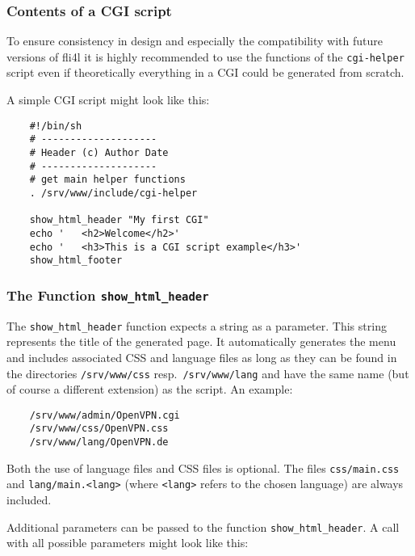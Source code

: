 \subsubsection{Contents of a CGI script}

To ensure consistency in design and especially the compatibility
with future versions of fli4l it is highly recommended to use the
functions of the \texttt{cgi-helper} script even if theoretically everything
in a CGI could be generated from scratch.

A simple CGI script might look like this:

\begin{example}
\begin{verbatim}
    #!/bin/sh
    # --------------------
    # Header (c) Author Date
    # --------------------
    # get main helper functions
    . /srv/www/include/cgi-helper

    show_html_header "My first CGI"
    echo '   <h2>Welcome</h2>'
    echo '   <h3>This is a CGI script example</h3>'
    show_html_footer

\end{verbatim}
\end{example}

\subsubsection{The Function \texttt{show\_html\_header}}

The \texttt{show\_html\_header} function expects a string as a parameter.
This string represents the title of the generated page. It automatically
generates the menu and includes associated CSS and language files
as long as they can be found in the directories \texttt{/srv/www/css} resp.\
\texttt{/srv/www/lang} and have the same name (but of course a different
extension) as the script. An example:

\begin{example}
\begin{verbatim}
    /srv/www/admin/OpenVPN.cgi
    /srv/www/css/OpenVPN.css
    /srv/www/lang/OpenVPN.de
\end{verbatim}
\end{example}

Both the use of language files and CSS files is optional. The files \texttt{css/main.css} and
\texttt{lang/main.<lang>} (where \texttt{<lang>} refers to the chosen language) are always included.

Additional parameters can be passed to the function \texttt{show\_html\_header}. A call with
all possible parameters might look like this:

